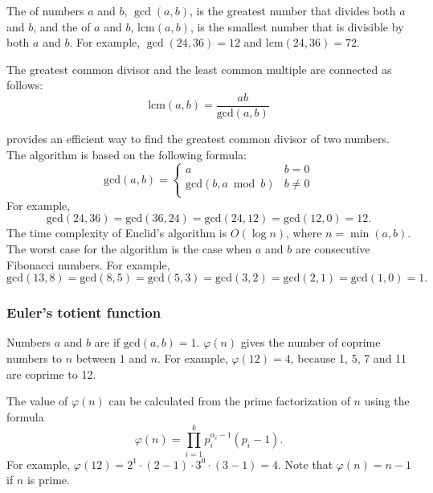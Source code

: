 
The  of
numbers $a$ and $b$, $\gcd(a,b)$,
is the greatest number that divides both $a$ and $b$,
and the  of
$a$ and $b$, $\textrm{lcm}(a,b)$,
is the smallest number that is divisible by
both $a$ and $b$.
For example,
$\gcd(24,36)=12$ and
$\textrm{lcm}(24,36)=72$.

The greatest common divisor and the least common multiple
are connected as follows:
\[\textrm{lcm}(a,b)=\frac{ab}{\textrm{gcd}(a,b)}\]

 provides an efficient way
to find the greatest common divisor of two numbers.
The algorithm is based on the following formula:
\begin{equation*}
    \textrm{gcd}(a,b) = \begin{cases}
               a        & b = 0\\
               \textrm{gcd}(b,a \bmod b) & b \neq 0\\
           \end{cases}
\end{equation*}
For example,
\[\textrm{gcd}(24,36) = \textrm{gcd}(36,24)
= \textrm{gcd}(24,12) = \textrm{gcd}(12,0)=12.\]
The time complexity of Euclid's algorithm
is $O(\log n)$, where $n=\min(a,b)$.
The worst case for the algorithm is
the case when $a$ and $b$ are consecutive Fibonacci numbers.
For example,
\[\textrm{gcd}(13,8)=\textrm{gcd}(8,5)
=\textrm{gcd}(5,3)=\textrm{gcd}(3,2)=\textrm{gcd}(2,1)=\textrm{gcd}(1,0)=1.\]

\subsubsection{Euler's totient function}


Numbers $a$ and $b$ are 
if $\textrm{gcd}(a,b)=1$.
 $\varphi(n)$
gives the number of coprime numbers to $n$
between $1$ and $n$.
For example, $\varphi(12)=4$,
because 1, 5, 7 and 11
are coprime to 12.

The value of $\varphi(n)$ can be calculated
from the prime factorization of $n$
using the formula
\[ \varphi(n) = \prod_{i=1}^k p_i^{\alpha_i-1}(p_i-1). \]
For example, $\varphi(12)=2^1 \cdot (2-1) \cdot 3^0 \cdot (3-1)=4$.
Note that $\varphi(n)=n-1$ if $n$ is prime.

